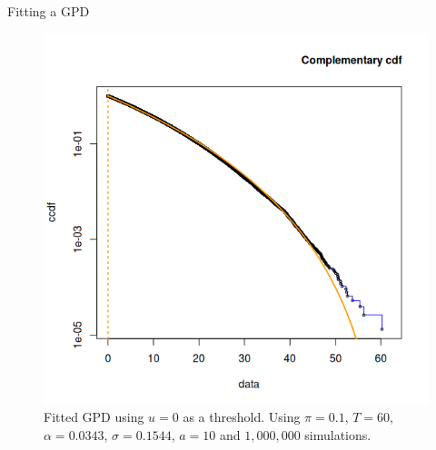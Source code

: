\documentclass[10pt]{beamer}
\begin{document}
\begin{frame}[fragile]{Fitting a GPD}
  \begin{figure}[h]
    \centering
    \includegraphics[scale=0.45]{cppi-ccdf-0.png}
    \caption{Fitted GPD using $u = 0 $ as a threshold. Using $\pi = 0.1$, $T=60$, $\alpha = 0.0343$, $\sigma = 0.1544$, $a=10$ and $1,000,000$ simulations.}
    \label{fig:cppi-ccdf-0}
  \end{figure}
\end{frame}
\end{document}
